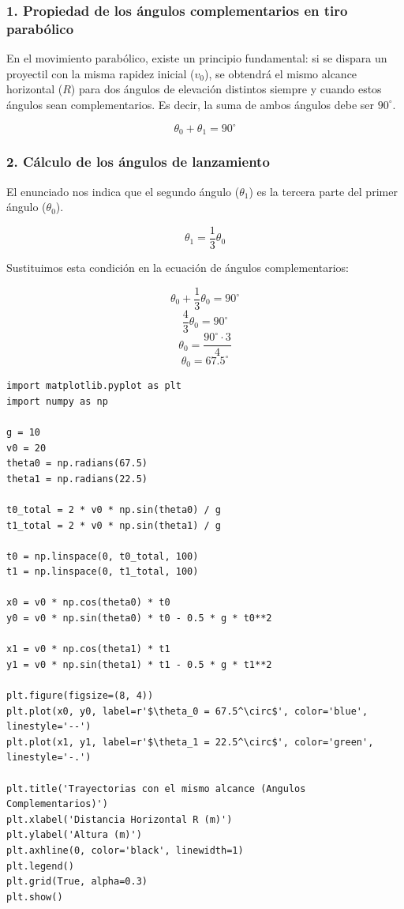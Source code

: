 \documentclass[12pt, a4paper]{article}
\begin{document}
\subsubsection*{1. Propiedad de los ángulos complementarios en tiro parabólico}
En el movimiento parabólico, existe un principio fundamental: si se dispara un proyectil con la misma rapidez inicial ($v_0$), se obtendrá el mismo alcance horizontal ($R$) para dos ángulos de elevación distintos siempre y cuando estos ángulos sean complementarios. Es decir, la suma de ambos ángulos debe ser $90^\circ$.

$$\theta_0 + \theta_1 = 90^\circ$$

\subsubsection*{2. Cálculo de los ángulos de lanzamiento}
El enunciado nos indica que el segundo ángulo ($\theta_1$) es la tercera parte del primer ángulo ($\theta_0$).

$$\theta_1 = \frac{1}{3}\theta_0$$

Sustituimos esta condición en la ecuación de ángulos complementarios:

$$\theta_0 + \frac{1}{3}\theta_0 = 90^\circ$$
$$\frac{4}{3}\theta_0 = 90^\circ$$
$$\theta_0 = \frac{90^\circ \cdot 3}{4}$$
$$\theta_0 = 67.5^\circ$$

\begin{lstlisting}
import matplotlib.pyplot as plt
import numpy as np

g = 10
v0 = 20
theta0 = np.radians(67.5)
theta1 = np.radians(22.5)

t0_total = 2 * v0 * np.sin(theta0) / g
t1_total = 2 * v0 * np.sin(theta1) / g

t0 = np.linspace(0, t0_total, 100)
t1 = np.linspace(0, t1_total, 100)

x0 = v0 * np.cos(theta0) * t0
y0 = v0 * np.sin(theta0) * t0 - 0.5 * g * t0**2

x1 = v0 * np.cos(theta1) * t1
y1 = v0 * np.sin(theta1) * t1 - 0.5 * g * t1**2

plt.figure(figsize=(8, 4))
plt.plot(x0, y0, label=r'$\theta_0 = 67.5^\circ$', color='blue', linestyle='--')
plt.plot(x1, y1, label=r'$\theta_1 = 22.5^\circ$', color='green', linestyle='-.')

plt.title('Trayectorias con el mismo alcance (Angulos Complementarios)')
plt.xlabel('Distancia Horizontal R (m)')
plt.ylabel('Altura (m)')
plt.axhline(0, color='black', linewidth=1)
plt.legend()
plt.grid(True, alpha=0.3)
plt.show()
\end{lstlisting}
\end{document}
